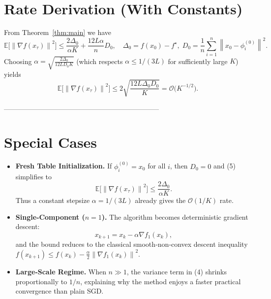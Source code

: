 \documentclass{article}
\newcommand{\E}{\mathbb{E}}
\newcommand{\norm}[1]{\left\|#1\right\|}
\newcommand{\grad}{\nabla}
\begin{document}
\section*{Rate Derivation (With Constants)}
From Theorem~\ref{thm:main} we have
\[
\E\!\bigl[\norm{\grad f(x_{\tau})}^{2}\bigr]
\le \frac{2\Delta_{0}}{\alpha K}
   +\frac{12L\alpha}{n}D_{0},
\quad
\Delta_{0}=f(x_{0})-f^{\star},
\;
D_{0}=\frac1n\sum_{i=1}^{n}\norm{x_{0}-\phi_i^{(0)}}^{2}.
\]
Choosing $\alpha = \sqrt{\frac{2\Delta_{0}}{12LD_{0}K}}$ (which respects $\alpha\le 1/(3L)$ for sufficiently large $K$) yields
\[
\E\!\bigl[\norm{\grad f(x_{\tau})}^{2}\bigr]
\le 2\sqrt{\frac{12L\Delta_{0}D_{0}}{K}} = \mathcal{O}\!\bigl(K^{-1/2}\bigr).
\]

--------------------------------------------------------------------

\section*{Special Cases}
\begin{itemize}
\item \textbf{Fresh Table Initialization.} If $\phi_i^{(0)}=x_{0}$ for all $i$, then $D_{0}=0$ and (5) simplifies to
\[
\E\!\bigl[\norm{\grad f(x_{\tau})}^{2}\bigr]\le \frac{2\Delta_{0}}{\alpha K}.
\]
Thus a constant stepsize $\alpha=1/(3L)$ already gives the $\mathcal{O}(1/K)$ rate.

\item \textbf{Single‑Component ($n=1$).} The algorithm becomes deterministic gradient descent:
\[
x_{k+1}=x_k-\alpha\grad f_{1}(x_k),
\]
and the bound reduces to the classical smooth‑non‑convex descent inequality
$f(x_{k+1})\le f(x_k)-\frac{\alpha}{2}\norm{\grad f_{1}(x_k)}^{2}$.

\item \textbf{Large‑Scale Regime.} When $n\gg 1$, the variance term in (4) shrinks proportionally to $1/n$, explaining why the method enjoys a faster practical convergence than plain SGD.
\end{itemize}
\end{document}

